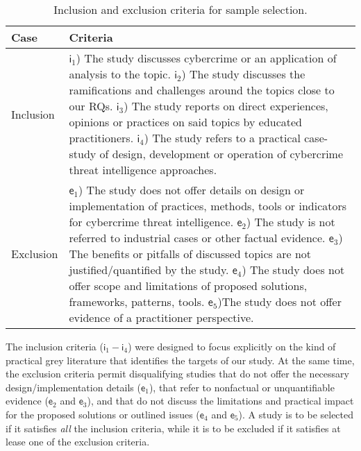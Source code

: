 \begin{table}[t]
\centering
\footnotesize
\begin{tabular}{p{}p{}}
\hline
	{\bf Case}
	&
    {\bf Criteria}
    \\
\hline
\rowcolor[HTML]{EFEFEF} 
	Inclusion 
    & 
	$\mathsf{i}_1$) The study discusses cybercrime or an application of analysis to the topic.\newline
	$\mathsf{i}_2$) The study discusses the ramifications and challenges around the topics close to our RQs.\newline
	$\mathsf{i}_3$) The study reports on direct experiences, opinions or practices on said topics by educated practitioners.\newline
	$\mathsf{i}_4$) The study refers to a practical case-study of design, development or operation of cybercrime threat intelligence approaches.
    \\
 	Exclusion 
    &
    $\mathsf{e}_1$) The study does not offer details on design or implementation of practices, methods, tools or indicators for cybercrime threat intelligence.\newline
	$\mathsf{e}_2$) The study is not referred to industrial cases or other factual evidence.\newline 
    $\mathsf{e}_3$) The benefits or pitfalls of discussed topics are not justified/quantified by the study.\newline
    $\mathsf{e}_4$) The study does not offer scope and limitations of proposed solutions, frameworks, patterns, tools.\newline 
    $\mathsf{e}_5$)The study does not offer evidence of a practitioner perspective.
 \\
\hline
\end{tabular}
\caption{Inclusion and exclusion criteria for sample selection.}
\label{tab:criteria}
\label{criteria}
\end{table}
%
The inclusion criteria ($\mathsf{i}_1 - \mathsf{i}_4$) were designed to focus explicitly on the kind of practical grey literature that identifies the targets of our study.
At the same time, the exclusion criteria permit disqualifying studies that do not offer the necessary design/implementation details ($\mathsf{e}_1$), that refer to nonfactual or unquantifiable evidence ($\mathsf{e}_2$ and $\mathsf{e}_3$), and that do not discuss the limitations and practical impact for the proposed solutions or outlined issues ($\mathsf{e}_4$ and $\mathsf{e}_5$). 
A study is to be selected if it satisfies {\em all} the inclusion criteria, while it is to be excluded if it satisfies at lease one of the exclusion criteria. %

